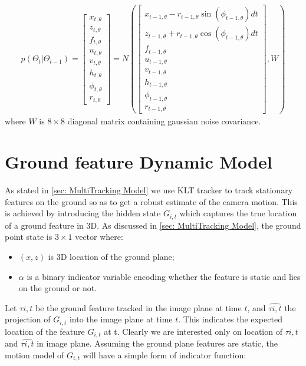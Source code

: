 \begin{eqnarray} \label{eqn: camera dynamics}
p(\Theta_{t} |\Theta_{t-1} )= 
 \left[
\begin{array}{c}
x_{t,\theta}  \\
z_{t,\theta}  \\
f_{t,\theta} \\
u_{t,\theta} \\
v_{t,\theta} \\
h_{t,\theta} \\
\phi_{t,\theta} \\
r_{t,\theta}
\end{array}
\right]
=
N(\left[
\begin{array}{c}
x_{t-1,\theta} - r_{t-1,\theta} \sin(\phi_{t-1,\theta} )dt \\
z_{t-1,\theta} + r_{t-1,\theta} \cos(\phi_{t-1,\theta} )dt \\
f_{t-1,\theta} \\
u_{t-1,\theta} \\
v_{t-1,\theta} \\
h_{t-1,\theta} \\
\phi_{t-1,\theta} \\
r_{t-1,\theta}
\end{array}
\right], W)
\end{eqnarray}
where $W$ is $8\times8$ diagonal matrix containing gaussian noise covariance.

\section{Ground feature Dynamic Model}
As stated in \ref{sec: MultiTracking Model} we use KLT tracker to track
stationary features on the ground so as to get a robust estimate of the camera
motion. This is achieved by introducing the hidden state $G_{i,t}$ which captures
the true location of a ground feature in 3D.
As  discussed in \ref{sec: MultiTracking Model}, the ground point state is $3\times1$ vector where:
 \begin{itemize}
\item $(x, z)$ is 3D location of the ground plane;
\item $\alpha$ is a binary indicator variable encoding whether the feature is static and lies on the ground or not.
\end{itemize} 
Let $\tau{i,t}$ be the ground feature tracked in the image plane at time $t$, and $\hat{\tau{i,t}}$ the projection of $G_{i,t}$ into the image plane at time $t$. This indicates the expected location of the feature $G_{i,t}$ at t. Clearly we are interested only on location of  $\tau{i,t}$ and $\hat{\tau{i,t}}$ in image plane.
Assuming the ground plane features are static, the motion model of  $G_{i,t}$ will have a simple form of indicator function:

